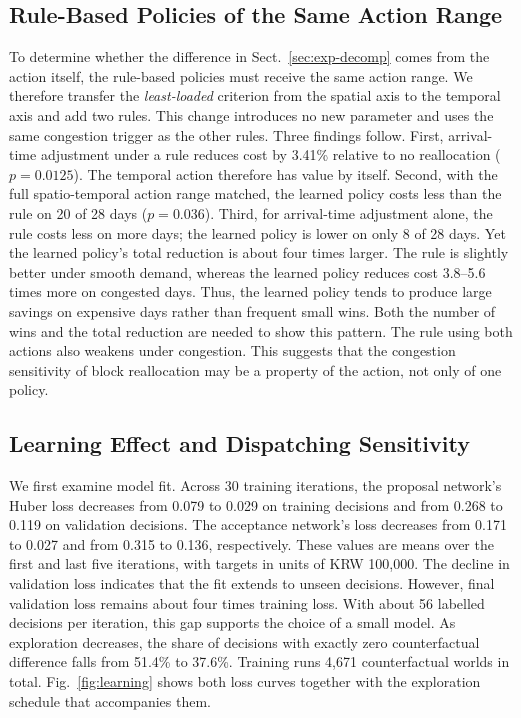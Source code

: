 \subsection{Rule-Based Policies of the Same Action Range}
\label{sec:exp-rules}
To determine whether the difference in Sect.~\ref{sec:exp-decomp} comes
from the action itself, the rule-based policies must receive the same
action range. We therefore transfer the \emph{least-loaded} criterion
from the spatial axis to the temporal axis and add two rules. This change
introduces no new parameter and uses the same congestion trigger as the
other rules. Three findings follow. First, arrival-time adjustment under
a rule reduces cost by 3.41\% relative to no reallocation
($p=0.0125$). The temporal action therefore has value by itself. Second,
with the full spatio-temporal action range matched, the learned policy
costs less than the rule on 20 of 28 days ($p=0.036$). Third, for
arrival-time adjustment alone, the rule costs less on more days; the
learned policy is lower on only 8 of 28 days. Yet the learned policy's
total reduction is about four times larger. The rule is slightly better
under smooth demand, whereas the learned policy reduces cost 3.8--5.6
times more on congested days. Thus, the learned policy tends to produce
large savings on expensive days rather than frequent small wins. Both
the number of wins and the total reduction are needed to show this
pattern. The rule using both actions also weakens under congestion. This
suggests that the congestion sensitivity of block reallocation may be a
property of the action, not only of one policy.

\subsection{Learning Effect and Dispatching Sensitivity}
\label{sec:exp-learning}
We first examine model fit. Across 30 training iterations, the proposal
network's Huber loss decreases from 0.079 to 0.029 on training decisions
and from 0.268 to 0.119 on validation decisions. The acceptance
network's loss decreases from 0.171 to 0.027 and from 0.315 to 0.136,
respectively. These values are means over the first and last five
iterations, with targets in units of KRW 100{,}000. The decline in
validation loss indicates that the fit extends to unseen decisions.
However, final validation loss remains about four times training loss.
With about 56 labelled decisions per iteration, this gap supports the
choice of a small model. As exploration decreases, the share of
decisions with exactly zero counterfactual difference falls from 51.4\%
to 37.6\%. Training runs 4{,}671 counterfactual worlds in total.
Fig.~\ref{fig:learning} shows both loss curves together with the
exploration schedule that accompanies them.

